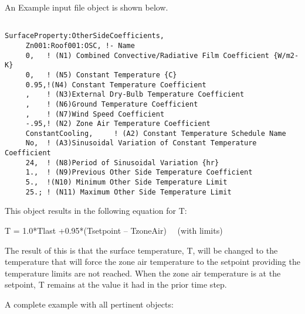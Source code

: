 An Example input file object is shown below.

\begin{lstlisting}

SurfaceProperty:OtherSideCoefficients,
     Zn001:Roof001:OSC, !- Name
     0,   ! (N1) Combined Convective/Radiative Film Coefficient {W/m2-K}
     0,   ! (N5) Constant Temperature {C}
     0.95,!(N4) Constant Temperature Coefficient
     ,    ! (N3)External Dry-Bulb Temperature Coefficient
     ,    ! (N6)Ground Temperature Coefficient
     ,    ! (N7)Wind Speed Coefficient
     -.95,! (N2) Zone Air Temperature Coefficient
     ConstantCooling,     ! (A2) Constant Temperature Schedule Name
     No,  ! (A3)Sinusoidal Variation of Constant Temperature Coefficient
     24,  ! (N8)Period of Sinusoidal Variation {hr}
     1.,  ! (N9)Previous Other Side Temperature Coefficient
     5.,  !(N10) Minimum Other Side Temperature Limit
     25.; ! (N11) Maximum Other Side Temperature Limit
\end{lstlisting}

This object results in the following equation for T:

T = 1.0*Tlast +0.95*(Tsetpoint -- TzoneAir)~~ (with limits)

The result of this is that the surface temperature, T, will be changed to the temperature that will force the zone air temperature to the setpoint providing the temperature limits are not reached. When the zone air temperature is at the setpoint, T remains at the value it had in the prior time step.

A complete example with all pertinent objects:


